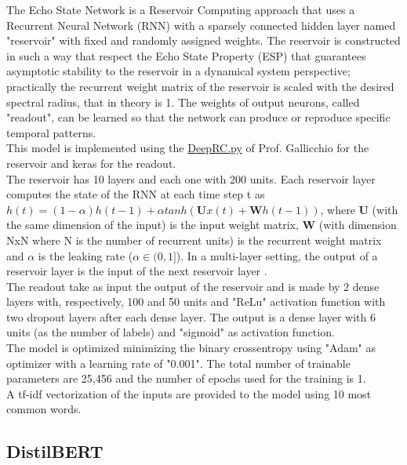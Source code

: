 \documentclass[10.5pt]{article}
\begin{document}
\begin{multicols*}{2}
The Echo State Network is a Reservoir Computing approach that uses a Recurrent Neural Network (RNN) with a sparsely connected hidden layer named "reservoir" with fixed and randomly assigned weights. The reservoir is constructed in such a way that respect the Echo State Property (ESP) that guarantees asymptotic stability to the reservoir in a dynamical system perspective; practically the recurrent weight matrix of the reservoir is scaled with the desired spectral radius, that in theory is 1. The weights of output neurons, called "readout", can be learned so that the network can produce or reproduce specific temporal patterns.\\
This model is implemented using the \href{https://github.com/gallicch/DeepRC-TF/blob/master/DeepRC.py}{DeepRC.py} of Prof. Gallicchio for the reservoir and keras for the readout.\\
The reservoir has 10 layers and each one with 200 units. Each reservoir layer computes the state of the RNN at each time step t as $h(t)=(1-\alpha)h(t-1)+\alpha tanh(\boldsymbol{U}x(t)+\boldsymbol{W}h(t-1))$, where $\boldsymbol{U}$ (with the same dimension of the input) is the input weight matrix, $\boldsymbol{W}$ (with dimension NxN where N is the number of recurrent units) is the recurrent weight matrix and $\alpha$ is the leaking rate ($\alpha \in (0,1]$). In a multi-layer setting, the output of a reservoir layer is the input of the next reservoir layer \cite{gallicchio2017deep}.\\
The readout take as input the output of the reservoir and is made by 2 dense layers with, respectively, 100 and 50 units and "ReLu" activation function with two dropout layers after each dense layer. The output is a dense layer with 6 units (as the number of labels) and "sigmoid" as activation function.\\
The model is optimized minimizing the binary crossentropy using "Adam" as optimizer with a learning rate of "0.001". The total number of trainable parameters are 25,456 and the number of epochs used for the training is 1.\\
A tf-idf vectorization of the inputs are provided to the model using 10 most common words.

\subsection{DistilBERT}


\end{multicols*}
\end{document}
